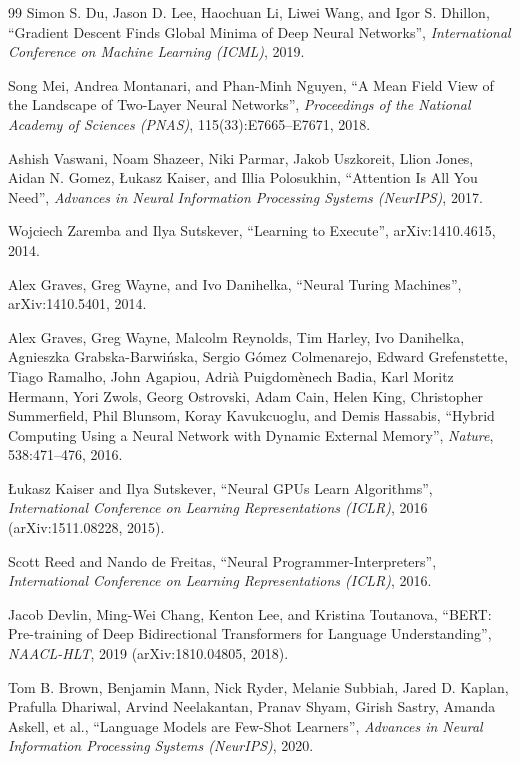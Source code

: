 \begin{thebibliography}{99}
     Simon S. Du, Jason D. Lee, Haochuan Li, Liwei Wang, and Igor S. Dhillon, ``Gradient Descent Finds Global Minima of Deep Neural Networks'', \emph{International Conference on Machine Learning (ICML)}, 2019.

     Song Mei, Andrea Montanari, and Phan-Minh Nguyen, ``A Mean Field View of the Landscape of Two-Layer Neural Networks'', \emph{Proceedings of the National Academy of Sciences (PNAS)}, 115(33):E7665--E7671, 2018.

     Ashish Vaswani, Noam Shazeer, Niki Parmar, Jakob Uszkoreit, Llion Jones, Aidan N. Gomez, \L{}ukasz Kaiser, and Illia Polosukhin, ``Attention Is All You Need'', \emph{Advances in Neural Information Processing Systems (NeurIPS)}, 2017.

     Wojciech Zaremba and Ilya Sutskever, ``Learning to Execute'', arXiv:1410.4615, 2014.

     Alex Graves, Greg Wayne, and Ivo Danihelka, ``Neural Turing Machines'', arXiv:1410.5401, 2014.

     Alex Graves, Greg Wayne, Malcolm Reynolds, Tim Harley, Ivo Danihelka, Agnieszka Grabska-Barwi\'nska, Sergio G\'omez Colmenarejo, Edward Grefenstette, Tiago Ramalho, John Agapiou, Adri\`a Puigdom\`enech Badia, Karl Moritz Hermann, Yori Zwols, Georg Ostrovski, Adam Cain, Helen King, Christopher Summerfield, Phil Blunsom, Koray Kavukcuoglu, and Demis Hassabis, ``Hybrid Computing Using a Neural Network with Dynamic External Memory'', \emph{Nature}, 538:471--476, 2016.

     \L{}ukasz Kaiser and Ilya Sutskever, ``Neural GPUs Learn Algorithms'', \emph{International Conference on Learning Representations (ICLR)}, 2016 (arXiv:1511.08228, 2015).

     Scott Reed and Nando de Freitas, ``Neural Programmer-Interpreters'', \emph{International Conference on Learning Representations (ICLR)}, 2016.

     Jacob Devlin, Ming-Wei Chang, Kenton Lee, and Kristina Toutanova, ``BERT: Pre-training of Deep Bidirectional Transformers for Language Understanding'', \emph{NAACL-HLT}, 2019 (arXiv:1810.04805, 2018).

     Tom B. Brown, Benjamin Mann, Nick Ryder, Melanie Subbiah, Jared D. Kaplan, Prafulla Dhariwal, Arvind Neelakantan, Pranav Shyam, Girish Sastry, Amanda Askell, et al., ``Language Models are Few-Shot Learners'', \emph{Advances in Neural Information Processing Systems (NeurIPS)}, 2020.


\end{thebibliography}
